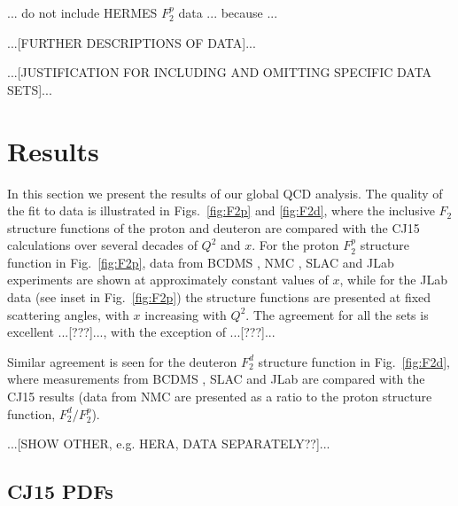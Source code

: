 \documentclass[aps,prd,amsmath,preprint]{revtex4}
\begin{document}
... do not include HERMES $F_2^p$ data ... because ...


{\color{red} ...[FURTHER DESCRIPTIONS OF DATA]...

...[JUSTIFICATION FOR INCLUDING AND OMITTING SPECIFIC DATA SETS]...}


\section{Results}
\label{sec:results}

In this section we present the results of our global QCD analysis.
The quality of the fit to data is illustrated in Figs.~\ref{fig:F2p}
and \ref{fig:F2d}, where the inclusive $F_2$ structure functions
of the proton and deuteron are compared with the CJ15 calculations
over several decades of $Q^2$ and $x$.
%
%
For the proton $F_2^p$ structure function in Fig.~\ref{fig:F2p},
data from BCDMS \cite{BCDMS}, NMC \cite{NMCp}, SLAC \cite{SLAC}
and JLab \cite{Malace} experiments are shown at approximately
constant values of $x$, while for the JLab data (see inset in
Fig.~\ref{fig:F2p}) the structure functions are presented at fixed
scattering angles, with $x$ increasing with $Q^2$.
The agreement for all the sets is excellent ...[???]...,
with the exception of ...[???]...


Similar agreement is seen for the deuteron $F_2^d$ structure function
in Fig.~\ref{fig:F2d}, where measurements from BCDMS \cite{BCDMS},
SLAC \cite{SLAC} and JLab \cite{Malace} are compared with the CJ15
results (data from NMC are presented as a ratio to the proton
structure function, $F_2^d/F_2^p$).

{\color{red} ...[SHOW OTHER, e.g. HERA, DATA SEPARATELY??]...}




\subsection{CJ15 PDFs}
\label{ssec:CJ15pdfs}
\end{document}
